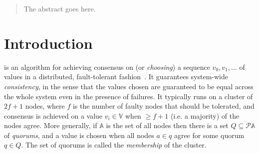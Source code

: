\documentclass[journal]{IEEEtran}
\begin{document}







\maketitle

\begin{abstract}
The abstract goes here. %
\end{abstract}







%
\IEEEpeerreviewmaketitle

\section{Introduction}

 is an algorithm for achieving consensus on (or
\textit{choosing}) a sequence $v_0, v_1, \ldots$ of values in a distributed,
fault-tolerant fashion~\cite{part-time-parliament}. It guarantees system-wide
\textit{consistency}, in the sense that the values chosen are guaranteed to be
equal across the whole system even in the presence of failures. It typically
runs on a cluster of $2f+1$ nodes, where $f$ is the number of faulty nodes that
should be tolerated, and consensus is achieved on a value $v_i \in \mathbb V$
when $\ge f+1$ (i.e.  a majority) of the nodes agree.  More generally, if
$\mathbb A$ is the set of all nodes then there is a set $Q \subseteq \mathcal P
\mathbb A$ of \textit{quorums}, and a value is chosen when all nodes $a \in q$
agree for some quorum $q \in Q$. The set of quorums is called the
\textit{membership} of the cluster.
\end{document}
